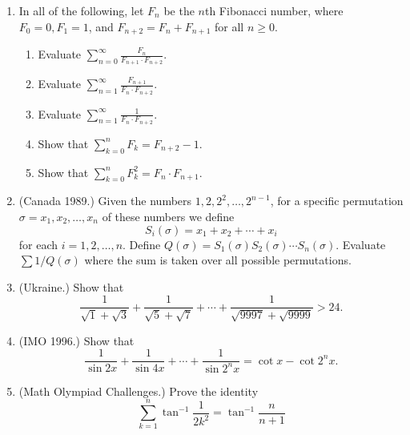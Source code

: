 \documentclass[12pt]{article}
\begin{document}
\begin{enumerate}
\item In all of the following, let $F_n$ be the $n$th Fibonacci number, where $F_0=0,F_1=1$, and $F_{n+2}=F_n+F_{n+1}$ for all $n\ge 0$.
\begin{enumerate}
\item Evaluate $\sum_{n=0}^\infty \frac{F_n}{F_{n+1}\cdot F_{n+2}}$.
\item Evaluate $\sum_{n=1}^\infty \frac{F_{n+1}}{F_n\cdot F_{n+2}}$.
\item Evaluate $\sum_{n=1}^\infty \frac{1}{F_n\cdot F_{n+2}}$.
\item Show that $\sum_{k=0}^n F_k=F_{n+2}-1$.
\item Show that $\sum_{k=0}^n F_k^2=F_n\cdot F_{n+1}$.
\end{enumerate}

\item (Canada 1989.)  Given the numbers $1,2,2^2,\ldots,2^{n-1}$, for a specific permutation $\sigma=x_1,x_2,\ldots,x_n$ of these numbers we define $$S_i(\sigma)=x_1+x_2+\cdots+x_i$$ for each $i=1,2,\ldots,n$.  Define $Q(\sigma)=S_1(\sigma)S_2(\sigma)\cdots S_n(\sigma)$.  Evaluate $\sum 1/Q(\sigma)$ where the sum is taken over all possible permutations.

\item (Ukraine.) Show that $$\frac{1}{\sqrt{1}+\sqrt{3}}+\frac{1}{\sqrt{5}+\sqrt{7}}+\cdots+\frac{1}{\sqrt{9997}+\sqrt{9999}}>24.$$

\item (IMO 1996.)  Show that $$\frac{1}{\sin 2x}+\frac{1}{\sin 4x}+\cdots+\frac{1}{\sin 2^nx}=\cot x-\cot 2^nx.$$

\item (Math Olympiad Challenges.) Prove the identity $$\sum_{k=1}^n \tan^{-1}\frac{1}{2k^2}=\tan^{-1}\frac{n}{n+1}$$
\end{enumerate}
\end{document}
